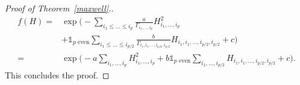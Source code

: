 \documentclass[10pt,a4paper]{amsart}
\begin{document}
\begin{proof}[Proof of Theorem~\ref{maxwell}.]
\begin{align*}
    f(H)={}& \exp \Bigg( -\sum_{i_1\leq\dots\leq i_p} \frac{a}{\Gamma_{i_1,\dots,i_p} } H_{i_{1},\dots,i_p}^2 \\
    &+ \mathds{1}_{p \text{ even}} \sum_{i_1 \leq\dots \leq i_{p/2}} \frac{b}{\Gamma_{i_1,i_1,\dots,i_{p/2},i_{p/2}} } H_{i_1,i_1,\dots,i_{p/2},i_{p/2}} +c \Bigg) \\
    ={}& \exp \Bigg( -a \sum_{i_1,\dots,i_p} H_{i_{1},\dots,i_p}^2 + b \mathds{1}_{p \text{ even}} \sum_{i_1,\dots, i_{p/2}} H_{i_1,i_1,\dots,i_{p/2},i_{p/2}} +c \Bigg).
\end{align*}
This concludes the proof.
\end{proof}
\end{document}
